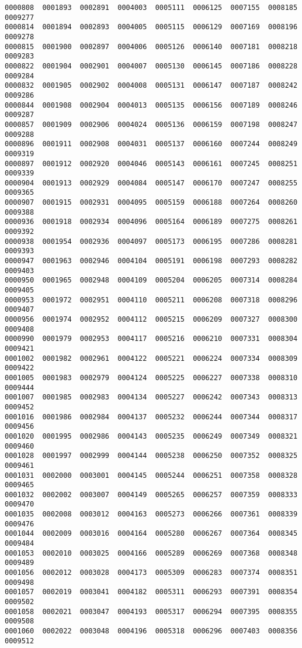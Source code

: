 \documentclass[11pt]{article}
\begin{document}
\begin{Verbatim}[commandchars=\\\{\}]
0000808  0001893  0002891  0004003  0005111  0006125  0007155  0008185	0009277
0000814  0001894  0002893  0004005  0005115  0006129  0007169  0008196	0009278
0000815  0001900  0002897  0004006  0005126  0006140  0007181  0008218	0009283
0000822  0001904  0002901  0004007  0005130  0006145  0007186  0008228	0009284
0000832  0001905  0002902  0004008  0005131  0006147  0007187  0008242	0009286
0000844  0001908  0002904  0004013  0005135  0006156  0007189  0008246	0009287
0000857  0001909  0002906  0004024  0005136  0006159  0007198  0008247	0009288
0000896  0001911  0002908  0004031  0005137  0006160  0007244  0008249	0009319
0000897  0001912  0002920  0004046  0005143  0006161  0007245  0008251	0009339
0000904  0001913  0002929  0004084  0005147  0006170  0007247  0008255	0009365
0000907  0001915  0002931  0004095  0005159  0006188  0007264  0008260	0009388
0000936  0001918  0002934  0004096  0005164  0006189  0007275  0008261	0009392
0000938  0001954  0002936  0004097  0005173  0006195  0007286  0008281	0009393
0000947  0001963  0002946  0004104  0005191  0006198  0007293  0008282	0009403
0000950  0001965  0002948  0004109  0005204  0006205  0007314  0008284	0009405
0000953  0001972  0002951  0004110  0005211  0006208  0007318  0008296	0009407
0000956  0001974  0002952  0004112  0005215  0006209  0007327  0008300	0009408
0000990  0001979  0002953  0004117  0005216  0006210  0007331  0008304	0009421
0001002  0001982  0002961  0004122  0005221  0006224  0007334  0008309	0009422
0001005  0001983  0002979  0004124  0005225  0006227  0007338  0008310	0009444
0001007  0001985  0002983  0004134  0005227  0006242  0007343  0008313	0009452
0001016  0001986  0002984  0004137  0005232  0006244  0007344  0008317	0009456
0001020  0001995  0002986  0004143  0005235  0006249  0007349  0008321	0009460
0001028  0001997  0002999  0004144  0005238  0006250  0007352  0008325	0009461
0001031  0002000  0003001  0004145  0005244  0006251  0007358  0008328	0009465
0001032  0002002  0003007  0004149  0005265  0006257  0007359  0008333	0009470
0001035  0002008  0003012  0004163  0005273  0006266  0007361  0008339	0009476
0001044  0002009  0003016  0004164  0005280  0006267  0007364  0008345	0009484
0001053  0002010  0003025  0004166  0005289  0006269  0007368  0008348	0009489
0001056  0002012  0003028  0004173  0005309  0006283  0007374  0008351	0009498
0001057  0002019  0003041  0004182  0005311  0006293  0007391  0008354	0009502
0001058  0002021  0003047  0004193  0005317  0006294  0007395  0008355	0009508
0001060  0002022  0003048  0004196  0005318  0006296  0007403  0008356	0009512

\end{Verbatim}
\end{document}
